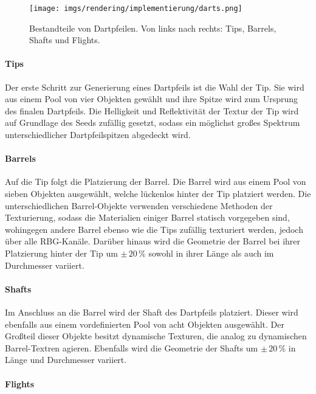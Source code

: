 \begin{figure}
    \centering
    \texttt{[image: imgs/rendering/implementierung/darts.png]}
    \caption{Bestandteile von Dartpfeilen. Von links nach rechts: Tips, Barrels, Shafts und Flights.}
    \label{img:darts_parts}
\end{figure}

\paragraph{Tips}

Der erste Schritt zur Generierung eines Dartpfeils ist die Wahl der Tip. Sie wird aus einem Pool von vier Objekten gewählt und ihre Spitze wird zum Ursprung des finalen Dartpfeils. Die Helligkeit und Reflektivität der Textur der Tip wird auf Grundlage des Seeds zufällig gesetzt, sodass ein möglichst großes Spektrum unterschiedlicher Dartpfeilspitzen abgedeckt wird.

\paragraph{Barrels}

Auf die Tip folgt die Platzierung der Barrel. Die Barrel wird aus einem Pool von sieben Objekten ausgewählt, welche lückenlos hinter der Tip platziert werden. Die unterschiedlichen Barrel-Objekte verwenden verschiedene Methoden der Texturierung, sodass die Materialien einiger Barrel statisch vorgegeben sind, wohingegen andere Barrel ebenso wie die Tips zufällig texturiert werden, jedoch über alle RBG-Kanäle. Darüber hinaus wird die Geometrie der Barrel bei ihrer Platzierung hinter der Tip um $\pm\,20\,\%$ sowohl in ihrer Länge als auch im Durchmesser variiert.

\paragraph{Shafts}

Im Anschluss an die Barrel wird der Shaft des Dartpfeils platziert. Dieser wird ebenfalls aus einem vordefinierten Pool von acht Objekten ausgewählt. Der Großteil dieser Objekte besitzt dynamische Texturen, die analog zu dynamischen Barrel-Textren agieren. Ebenfalls wird die Geometrie der Shafts um $\pm\,20\,\%$ in Länge und Durchmesser variiert.

\paragraph{Flights}

